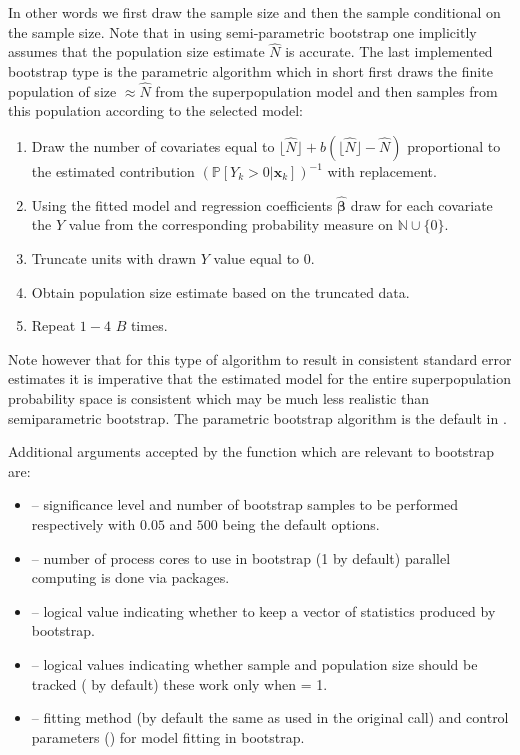 \documentclass[
]{jss}
\newcommand{\1}{\mathcal{I}} \newcommand{\bZero}{\boldsymbol{0}}
\newcommand{\bx}{\boldsymbol{x}} \newcommand{\bX}{\boldsymbol{X}}
\newcommand{\bbeta}{\boldsymbol{\beta}}
\begin{document}
In other words we first draw the sample size and then the sample
conditional on the sample size. Note that in using semi-parametric
bootstrap one implicitly assumes that the population size estimate
\(\hat{N}\) is accurate. The last implemented bootstrap type is the
parametric algorithm which in short first draws the finite population of
size \(\approx\hat{N}\) from the superpopulation model and then samples
from this population according to the selected model:

\begin{enumerate}
    \item Draw the number of covariates equal to $\lfloor\hat{N}\rfloor+b\left(\lfloor\hat{N}\rfloor-\hat{N}\right)$ proportional to the estimated contribution $(\mathbb{P}\left[Y_{k}>0|\bx_{k}\right])^{-1}$ with replacement.
    \item Using the fitted model and regression coefficients $\hat{\bbeta}$ draw for each covariate the $Y$ value from the corresponding probability measure on $\mathbb{N}\cup\{0\}$.
    \item Truncate units with drawn $Y$ value equal to $0$.
    \item Obtain population size estimate based on the truncated data.
    \item Repeat $1-4$ $B$ times.
\end{enumerate}

Note however that for this type of algorithm to result in consistent
standard error estimates it is imperative that the estimated model for
the entire superpopulation probability space is consistent which may be
much less realistic than semiparametric bootstrap. The parametric
bootstrap algorithm is the default in .

Additional arguments accepted by the  function which
are relevant to bootstrap are:

\begin{itemize}
  \item {} -- significance level and number of bootstrap samples to be performed respectively with $0.05$ and $500$ being the default options.
  \item {} -- number of process cores to use in bootstrap (1 by default) parallel computing is done via  packages.
  \item {} --  logical value indicating whether to keep a vector of statistics produced by bootstrap.
  \item {} --  logical values indicating whether sample and population size should be tracked ( by default) these work only when  = 1.
    \item {} -- fitting method (by default the same as used in the original call) and control parameters () for model fitting in bootstrap.
\end{itemize}
\end{document}
